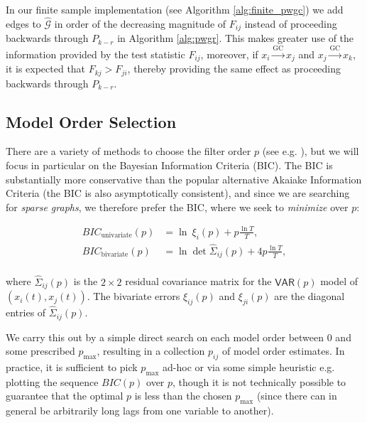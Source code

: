 \documentclass[12pt]{article}
\def\gc{\overset{\text{GC}}{\rightarrow}}  %
\def\gcg{\mathcal{G}}  %
\def\VAR{\mathsf{VAR}}  %
\begin{document}
In our finite sample implementation (see Algorithm
\ref{alg:finite_pwgc}) we add edges to $\widehat{\gcg}$ in order of
the decreasing magnitude of $F_{ij}$ instead of proceeding backwards
through $P_{k - r}$ in Algorithm \ref{alg:pwgr}.  This makes greater
use of the information provided by the test statistic $F_{ij}$,
moreover, if $x_i \gc x_j$ and $x_j \gc x_k$, it is expected that
$F_{kj} > F_{ji}$, thereby providing the same effect as proceeding
backwards through $P_{k - r}$.
\subsection{Model Order Selection}
\label{sec:model_order_selection}
There are a variety of methods to choose the filter order $p$ (see
e.g. \cite{lutkepohl2005new}), but we will focus in particular on the
Bayesian Information Criteria (BIC).  The BIC is substantially more
conservative than the popular alternative Akaiake Information Criteria
(the BIC is also asymptotically consistent), and since we are
searching for \textit{sparse graphs}, we therefore prefer the BIC,
where we seek to \textit{minimize} over $p$:

\begin{equation}
  \label{eqn:bic}
  \begin{aligned}
    BIC_{\text{univariate}}(p) &= \ln\ \xi_i(p) + p\frac{\ln T}{T},\\
    BIC_{\text{bivariate}}(p) &= \ln \det \widehat{\Sigma}_{ij}(p) + 4p\frac{\ln T}{T},\\
  \end{aligned}
\end{equation}

where $\widehat{\Sigma}_{ij}(p)$ is the $2 \times 2$ residual
covariance matrix for the $\VAR(p)$ model of $(x_i(t), x_j(t))$.  The
bivariate errors $\xi_{ij}(p)$ and $\xi_{ji}(p)$ are the diagonal
entries of $\widehat{\Sigma}_{ij}(p)$.

We carry this out by a simple direct search on each model order
between $0$ and some prescribed $p_\text{max}$, resulting in a
collection $p_{ij}$ of model order estimates.  In practice, it is
sufficient to pick $p_\text{max}$ ad-hoc or via some simple heuristic
e.g. plotting the sequence $BIC(p)$ over $p$, though it is not
technically possible to guarantee that the optimal $p$ is less than
the chosen $p_\text{max}$ (since there can in general be arbitrarily
long lags from one variable to another).
\end{document}
